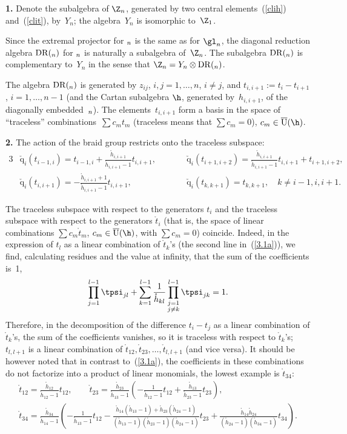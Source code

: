 \documentclass[pdftex]{sigma}
\def\nplus{\mathfrak{n}}\def\nn{\nonumber}\def\nin{\noindent}
\def\q{\check{\mathrm q}}\def\Q{\mathrm{Q}}\def\r#1{(\ref{#1})}\let\rf=\r
\def\s{z}\def\S{\mathrm {S}}\def\si{\sigma}\def\Sp{\S^{\nplus}}\def\sy{\acute{\sigma}}\def\th{\mathring{h}}
\def\tt{\mathring{t}}\def\U{\mathrm{U}}\def\Uh{\overline{\U}(\h)}\def\UU{\overline{\U}}\def\UUh{{\cal{D}}(\h)}
\numberwithin{equation}{section}
\begin{document}
{\bf 1.} Denote the subalgebra of $\Z_n$, generated by two central elements~\rf{clih} and~\r{clit}, by~$Y_n$; the algebra~$Y_n$ is isomorphic to~$\Z_1$.


Since the extremal projector for $\sl_n$ is the same as for $\gl_n$, the diagonal reduction algebra ${\mathrm{DR}}(\sl_n)$ for $\sl_n$ is
naturally a subalgebra of~$\Z_n$. The subalgebra ${\mathrm{DR}}(\sl_n)$ is complementary to~$Y_n$ in the sense
that $\Z_n=Y_n\otimes {\mathrm{DR}}(\sl_n)$.


The algebra ${\mathrm{DR}}(\sl_n)$ is generated by $\s_{ij}$, $i,j=1,\dots ,n$, $i\neq j$, and $t_{i,i+1}:=t_i-t_{i+1}$, $i=1,\dots ,n-1$
(and the Cartan subalgebra $\h$, generated by~$h_{i,i+1}$, of the diagonally embedded~$\sl_n$). The elements~$t_{i,i+1}$ form a basis
in the space of ``traceless'' combinations~$\sum c_mt_m$ (traceless means that  $\sum c_m=0$), $c_m\in \Uh$.

{\bf 2.} The action of the braid group restricts onto the traceless subspace:
\begin{alignat*}{3}
& \q_i(t_{i-1,i})=t_{i-1,i}+
 \frac{\th_{i,i+1}}{\th_{i,i+1}-1} t_{i,i+1} ,\qquad &&
\q_i(t_{i+1,i+2})= \frac{\th_{i,i+1}}{\th_{i,i+1}-1} t_{i,i+1}+t_{i+1,i+2} ,& \\
& \q_i(t_{i,i+1})=- \frac{\th_{i,i+1}+1}{\th_{i,i+1}-1}t_{i,i+1} ,\qquad & &
\q_i(t_{k,k+1})=t_{k,k+1} ,\quad  k\neq i-1,i,i+1 . &
\end{alignat*}

The traceless subspace with respect to the generators $t_i$ and the traceless subspace with respect to the generators $\tt_i$
(that is, the space of linear combinations $\sum c_m\tt_m$, $c_m\in \Uh$, with $\sum c_m=0$) coincide.  Indeed, in the expression of $t_l$ as a linear
combination of $\tt_k$'s (the second line in~\rf{3.1a}), we f\/ind, calculating residues and the value at inf\/inity, that the sum of the coef\/f\/icients is~1,
\begin{gather*}
\prod_{j=1}^{l-1}\tpsi_{jl}+\sum_{k=1}^{l-1} \frac{1}{\th_{kl}}
\prod_{\substack{j=1 \\ j\neq k}}^{l-1}\tpsi_{jk}=1  .
\end{gather*}
Therefore, in the decomposition of the dif\/ference $t_i-t_j$ as a linear combination of $\tt_k$'s, the sum of the coef\/f\/icients vanishes, so it is traceless with
respect to $\tt_k$'s; $t_{l,l+1}$ is a linear combination of $\tt_{12},\tt_{23},\dots ,\tt_{l,l+1}$ (and vice versa). It should be however noted that in contrast to~\rf{3.1a}, the coef\/f\/icients in these combinations do not factorize into a product of linear monomials, the lowest example
is $\tt_{34}$:
\begin{gather*}
\tt_{12}= \frac{\th_{12}}{\th_{12}-1}t_{12} ,\qquad \tt_{23}=\frac{\th_{23}}{\th_{13}-1}\left( -\frac{1}{\th_{12}-1}t_{12}
+\frac{\th_{13}}{\th_{23}-1}t_{23}\right) ,\\
\tt_{34}= \frac{\th_{34}}{\th_{14}-1}\left( -\frac{1}{\th_{13}-1}t_{12}-
\frac{\th_{14}(\th_{13}-1)+\th_{23}(\th_{24}-1)}
{(\th_{13}-1)(\th_{23}-1)(\th_{24}-1)}t_{23}
+\frac{\th_{14}\th_{24}}{(\th_{24}-1)(\th_{34}-1)}t_{34}\right)  .
\end{gather*}
\end{document}

